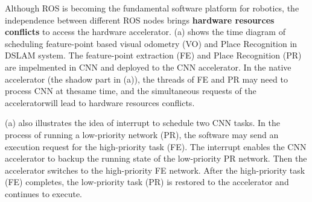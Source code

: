 



 Although ROS is becoming the fundamental software platform for robotics, the independence between different ROS nodes brings \textbf{hardware resources conflicts} to access the hardware accelerator. (a) shows the time diagram of scheduling feature-point based visual odometry (VO) and Place Recognition in DSLAM system. The feature-point extraction (FE) and Place Recognition (PR) are impelmented in CNN and deployed to the CNN accelerator. In the native accelerator (the shadow part in  (a)), the  threads  of  FE  and  PR  may  need  to  process  CNN  at  thesame  time,  and  the  simultaneous  requests  of  the  acceleratorwill  lead  to  hardware  resources  conflicts. 

(a) also illustrates the idea of interrupt to schedule two CNN tasks. In the process of running a low-priority network (PR), the software may send an execution request for the high-priority task (FE). The interrupt enables the CNN accelerator to backup the running state of the low-priority PR network. Then the accelerator switches to the high-priority FE network. After the high-priority task (FE) completes, the low-priority task (PR) is restored to the accelerator and continues to execute.


